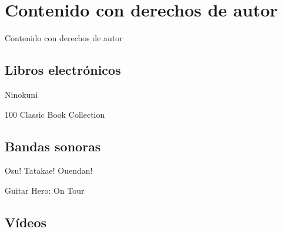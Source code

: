 
\section[Contenido con copyright]{Contenido con derechos de autor}
\begin{frame}{Contenido con derechos de autor}

\end{frame}

\subsection{Libros electrónicos}
\begin{frame}{Ninokuni}

\end{frame}

\begin{frame}{100 Classic Book Collection}

\end{frame}

\subsection{Bandas sonoras}
\begin{frame}{Osu! Tatakae! Ouendan!}

\end{frame}

\begin{frame}{Guitar Hero: On Tour}

\end{frame}

\subsection{Vídeos}
\begin{frame}
\end{frame}
